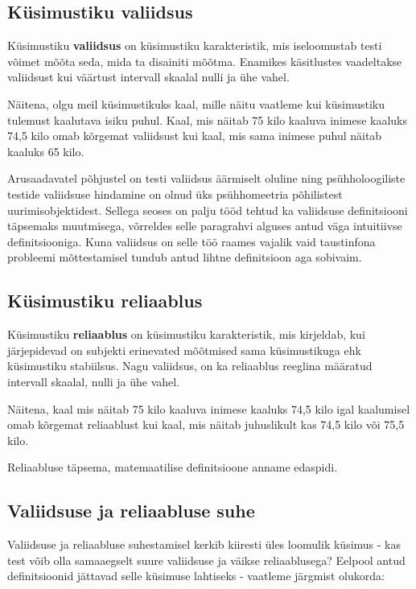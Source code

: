 \documentclass[a4paper,12pt,oneside]{article}
\numberwithin{equation}{section}
\theoremstyle{definition}
\begin{document}
\subsection{Küsimustiku valiidsus}

Küsimustiku \textbf{valiidsus} on küsimustiku karakteristik, mis iseloomustab testi võimet mõõta seda, mida ta disainiti mõõtma. Enamikes käsitlustes vaadeltakse valiidsust kui väärtust intervall skaalal nulli ja ühe vahel.

Näitena, olgu meil küsimustikuks kaal, mille näitu vaatleme kui küsimustiku tulemust kaalutava isiku puhul. Kaal, mis näitab 75 kilo kaaluva inimese kaaluks 74,5 kilo omab kõrgemat valiidsust kui kaal, mis sama inimese puhul näitab kaaluks 65 kilo.   

Arusaadavatel põhjustel on testi valiidsus äärmiselt oluline ning psühholoogiliste testide valiidsuse hindamine on olnud üks psühhomeetria põhilistest uurimisobjektidest. Sellega seoses on palju tööd tehtud ka valiidsuse definitsiooni täpsemaks muutmisega, võrreldes selle paragrahvi alguses antud väga intuitiivse definitsiooniga. Kuna valiidsus on selle töö raames vajalik vaid taustinfona probleemi mõttestamisel tundub antud lihtne definitsioon aga sobivaim. 

\subsection{Küsimustiku reliaablus}

Küsimustiku \textbf{reliaablus} on küsimustiku karakteristik, mis kirjeldab, kui järjepidevad on subjekti erinevated mõõtmised sama küsimustikuga ehk küsimustiku stabiilsus. Nagu valiidsus, on ka reliaablus reeglina määratud intervall skaalal, nulli ja ühe vahel. 

Näitena, kaal mis näitab 75 kilo kaaluva inimese kaaluks 74,5 kilo igal kaalumisel omab kõrgemat reliaablust kui kaal, mis näitab juhuslikult kas 74,5 kilo või 75,5 kilo. 

Reliaabluse täpsema, matemaatilise definitsioone anname edaspidi. 

\subsection{Valiidsuse ja reliaabluse suhe}

Valiidsuse ja reliaabluse suhestamisel kerkib kiiresti üles loomulik küsimus - kas test võib olla samaaegselt suure valiidsuse ja väikse reliaablusega? Eelpool antud definitsioonid jättavad selle küsimuse lahtiseks - vaatleme järgmist olukorda:
\end{document}
